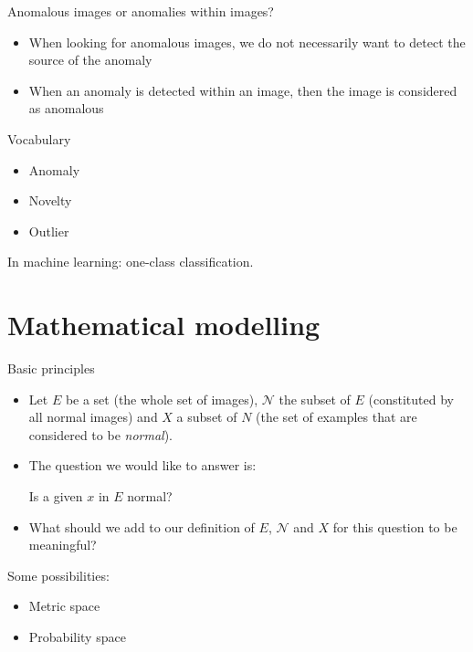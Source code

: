 \documentclass[xcolor=pdftex,dvipsnames,table,mathserif]{beamer}
\begin{document}
\begin{frame}{Anomalous images or anomalies within images?}

  \begin{itemize}
  \item When looking for anomalous images, we do not necessarily want to detect the source of the anomaly
  \item When an anomaly is detected within an image, then the image is considered as anomalous
  \end{itemize}

\end{frame}


\begin{frame}{Vocabulary}

  \begin{itemize}
  \item Anomaly
  \item Novelty
  \item Outlier
  \end{itemize}

  In machine learning: one-class classification.
\end{frame}


\section{Mathematical modelling}

\begin{frame}{Basic principles}

  \begin{itemize}
  \item   Let $E$ be a set (the whole set of images), $\mathcal{N}$ the subset of $E$ (constituted by all normal images) and $X$ a subset of $N$ (the set of examples that are considered to be \emph{normal}).
  \item The question we would like to answer is:

    \begin{block}{}
      \centering
    Is a given $x$ in $E$ normal?
    \end{block}

    \item What should we add to our definition of $E$, $\mathcal{N}$ and $X$ for this question to be meaningful?
  \end{itemize}

  Some possibilities:
  \begin{itemize}
  \item Metric space
  \item Probability space
  \end{itemize}

\end{frame}
\end{document}

